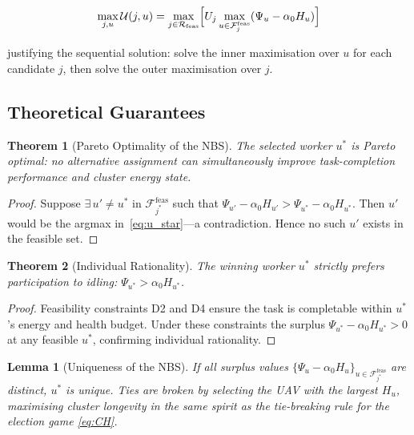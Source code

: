 \documentclass[journal]{IEEEtran}
\newtheorem{lemma}{Lemma}
\newtheorem{theorem}{Theorem}
\begin{document}
\begin{IEEEproof}
\begin{equation}\label{eq:separability}
  \max_{j,u}\mathcal{U}(j,u)
  =\max_{j\in\mathcal{R}_{\mathrm{feas}}}
  \Bigl[U_{j}
  \max_{u\in\mathcal{F}_{j}^{\mathrm{feas}}}
  (\Psi_{u}-\alpha_{0}H_{u})\Bigr]
\end{equation}

justifying the sequential solution: solve the inner
maximisation over $u$ for each candidate $j$, then solve
the outer maximisation over $j$.

\subsection{Theoretical Guarantees}\label{sec:offload_theory}

\begin{theorem}[Pareto Optimality of the NBS]\label{thm:pareto}
The selected worker $u^{*}$ is Pareto optimal: no
alternative assignment can simultaneously improve
task-completion performance and cluster energy state.
\end{theorem}
\begin{proof}
Suppose $\exists\,u'\neq u^{*}$ in
$\mathcal{F}_{j^{*}}^{\mathrm{feas}}$ such that
$\Psi_{u'}-\alpha_{0}H_{u'}
>\Psi_{u^{*}}-\alpha_{0}H_{u^{*}}$.
Then $u'$ would be the argmax in~\eqref{eq:u_star}---a
contradiction.  Hence no such $u'$ exists in the feasible
set.
\end{proof}

\begin{theorem}[Individual Rationality]\label{thm:ir}
The winning worker $u^{*}$ strictly prefers participation
to idling: $\Psi_{u^{*}}>\alpha_{0}H_{u^{*}}$.
\end{theorem}
\begin{proof}
Feasibility constraints D2 and D4 ensure the task is
completable within $u^{*}$'s energy and health budget.
Under these constraints the surplus
$\Psi_{u^{*}}-\alpha_{0}H_{u^{*}}>0$ at any feasible
$u^{*}$, confirming individual rationality.
\end{proof}

\begin{lemma}[Uniqueness of the NBS]\label{lem:unique_nbs}
If all surplus values
$\{\Psi_{u}-\alpha_{0}H_{u}\}_{u\in\mathcal{F}_{j^{*}}^{\mathrm{feas}}}$
are distinct, $u^{*}$ is unique.  Ties are broken by
selecting the UAV with the largest $H_{u}$, maximising
cluster longevity in the same spirit as the tie-breaking
rule for the election game \eqref{eq:CH}.
\end{lemma}




\end{IEEEproof}
\end{document}
